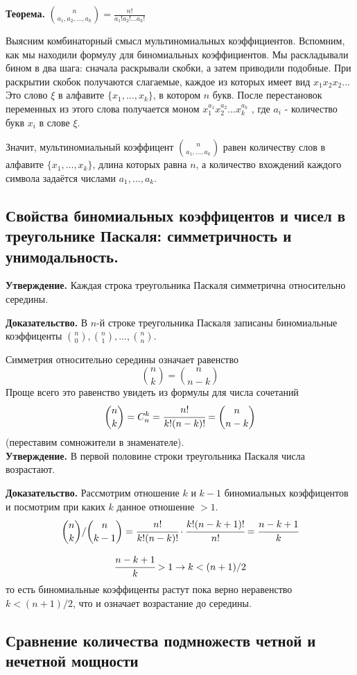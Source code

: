 \documentclass[a4paper, 10pt]{article}
\begin{document}
\textbf{Теорема.} $\binom{n}{a_1, a_2, \dots , a_k} = \frac{n!}{a_1!a_2! \dots a_k!}$

Выясним комбинаторный смысл мультиномиальных коэффициентов. Вспомним,
как мы находили формулу для биномиальных коэффициентов. Мы раскладывали
бином в два шага: сначала раскрывали скобки, а затем приводили подобные. При раскрытии скобок получаются слагаемые, каждое из которых имеет вид $x_1x_2x_2 \dots$ Это слово $\xi$ в алфавите $\{x_1, \dots ,x_k\}$, в котором $n$ букв.
После перестановок переменных из этого слова получается моном $x_1^{a_1}x_2^{a_2} \dots x_k^{a_k}$ , где $a_i$ - количество букв $x_i$ в слове $\xi$.

Значит, мультиномиальный коэффицент $\binom{n}{a_1, \dots, a_k}$ равен количеству слов в алфавите $\{x_1, \dots, x_k\}$, длина которых равна $n$, а количество вхождений каждого символа задаётся числами $a_1, \dots, a_k$.

\subsection{Свойства биномиальных коэффицентов и чисел в треугольнике Паскаля: симметричность и унимодальность.}

\textbf{Утверждение.} Каждая строка треугольника Паскаля симметрична относительно середины.

\textbf{Доказательство.} В $n$-й строке треугольника Паскаля записаны биномиальные коэффиценты $\binom{n}{0}, \binom{n}{1}, \dots , \binom{n}{n}$.

Симметрия относительно середины означает равенство $$\binom{n}{k} = \binom{n}{n - k}$$
Проще всего это равенство увидеть из формулы для числа сочетаний $$\binom{n}{k} = C^k_n = \cfrac{n!}{k!(n-k)!} = \binom{n}{n-k}$$ (переставим сомножители в знаменателе). \\

\textbf{Утверждение.} В первой половине строки треугольника Паскаля числа возрастают.

\textbf{Доказательство.} Рассмотрим отношение $k$ и $k - 1$ биномиальных коэффицентов и посмотрим при каких $k$ данное отношение $> 1$. $$\binom{n}{k} / \binom{n}{k - 1} = \cfrac{n!}{k!(n-k)!} \cdot \cfrac{k!(n-k+1)!}{n!} = \cfrac{n - k + 1}{k}$$

$$\cfrac{n - k + 1}{k} > 1 \to k < (n + 1) / 2$$ то есть биномиальные коэффиценты растут пока верно неравенство $k < (n + 1) / 2$, что и означает возрастание до середины.

\subsection{Сравнение количества подмножеств четной и нечетной мощности}
\end{document}
